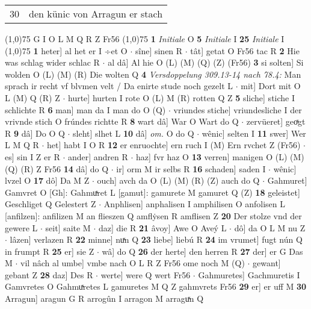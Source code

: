 \documentclass[8pt,a4paper,notitlepage]{article}
\begin{document}
\begin{table}[ht]
\begin{minipage}[t]{0.5\linewidth}
\begin{tabular}{rl}
30 & den künic von Arragun er stach\\ 
\end{tabular}
\scriptsize
\line(1,0){75} \newline
G I O L M Q R Z Fr56 \newline
\line(1,0){75} \newline
\textbf{1} \textit{Initiale} O  \textbf{5} \textit{Initiale} I  \textbf{25} \textit{Initiale} I  \newline
\line(1,0){75} \newline
\textbf{1} heter] al het er I ÷et O  $\cdot$ sîne] sinen R  $\cdot$ tât] getat O Fr56 tac R \textbf{2} Hie was schlag wider schlac R  $\cdot$ al dâ] Al hie O (L) (M) (Q) (Z) (Fr56) \textbf{3} si solten] Si wolden O (L) (M) (R) Die wolten Q \textbf{4} \textit{Versdoppelung 309.13-14 nach 78.4:} Man sprach ir recht vf blvmen velt / Da enirte stude noch gezelt L   $\cdot$ mit] Dort mit O L (M) Q (R) Z  $\cdot$ hurte] hurten I rote O (L) M (R) rotten Q Z \textbf{5} sliche] stiche I schlichte R \textbf{6} man] man da I man do O (Q)  $\cdot$ vriundes stiche] vriundesliche I der vrivnde stich O frúndes richtte R \textbf{8} wart dâ] War O Wart do Q  $\cdot$ zervüeret] geoͯgt R \textbf{9} dâ] Do O Q  $\cdot$ sleht] slhet L \textbf{10} dâ] \textit{om.} O do Q  $\cdot$ wênic] selten I \textbf{11} swer] Wer L M Q R  $\cdot$ het] habt I O R \textbf{12} er enruochte] ern ruch I (M) Ern rvchet Z (Fr56)  $\cdot$ es] sin I Z er R  $\cdot$ ander] andren R  $\cdot$ haz] fvr haz O \textbf{13} verren] manigen O (L) (M) (Q) (R) Z Fr56 \textbf{14} dâ] do Q  $\cdot$ ir] orm M ir selbs R \textbf{16} schaden] saden I  $\cdot$ wênic] lvzel O \textbf{17} dô] Da M Z  $\cdot$ ouch] avch da O (L) (M) (R) (Z) auch do Q  $\cdot$ Gahmuret] Gamvret O [Gh]: Gahmuͯret L [gamut]: gamurete M gamuret Q (Z) \textbf{18} geleistet] Geschliget Q Gelestert Z  $\cdot$ Anphlisen] anphalisen I amphilisen O anfolisen L [anfilzen]: anfilizen M an flieszen Q amflẏsen R amflisen Z \textbf{20} Der stolze vnd der gewere L  $\cdot$ seit] saite M  $\cdot$ daz] die R \textbf{21} âvoy] Awe O Aveý L  $\cdot$ dô] da O L M nu Z  $\cdot$ lâzen] verlazen R \textbf{22} minne] nuͯn Q \textbf{23} liebe] liebú R \textbf{24} im vrumet] fugt nún Q in frumpt R \textbf{25} er] sie Z  $\cdot$ wâ] do Q \textbf{26} der herte] den herren R \textbf{27} der] er G Das M  $\cdot$ vil nâch al umbe] vmbe nach O L R Z Fr56 ome noch M (Q)  $\cdot$ gewant] gebant Z \textbf{28} daz] Des R  $\cdot$ werte] were Q wert Fr56  $\cdot$ Gahmuretes] Gachmuretis I Gamvretes O Gahmuͯretes L gamuretes M Q Z gahmvrets Fr56 \textbf{29} er] er uff M \textbf{30} Arragun] aragun G R arrogûn I arragon M arraguͯn Q \newline

\end{minipage}
\end{table}
\end{document}
